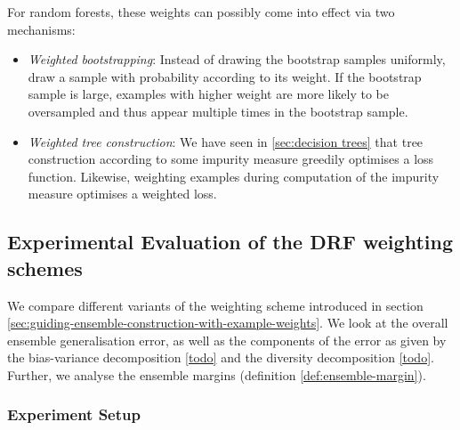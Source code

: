 \documentclass[../main.tex]{subfiles}
\begin{document}
For random forests, these weights can possibly come into effect via two mechanisms:
\begin{itemize}
    \item \textit{Weighted bootstrapping}: Instead of drawing the bootstrap samples uniformly, draw a sample with probability according to its weight. If the bootstrap sample is large, examples with higher weight are more likely to be oversampled and thus appear multiple times in the bootstrap sample. 
    \item \textit{Weighted tree construction}: We have seen in \ref{sec:decision trees} that tree construction according to some impurity measure greedily optimises a loss function. Likewise, weighting examples during computation of the impurity measure optimises a weighted loss.
\end{itemize}


\subsection{Experimental Evaluation of the DRF weighting schemes}


We compare different variants of the weighting scheme introduced in section \ref{sec:guiding-ensemble-construction-with-example-weights}. We look at the overall ensemble generalisation error, as well as the components of the error as given by the bias-variance decomposition \ref{todo} and the diversity decomposition \ref{todo}. Further, we analyse the ensemble margins (definition \ref{def:ensemble-margin}).

\subsubsection{Experiment Setup}
\label{sec:experiment-setup}
\end{document}
